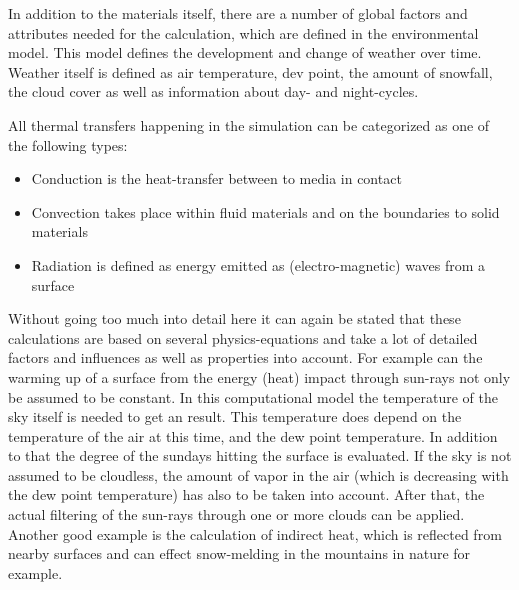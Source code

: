 In addition to the materials itself, there are a number of global factors and attributes needed for the calculation, which are defined in the environmental model. This model defines the development and change of weather over time. Weather itself is defined as air temperature, dev point, the amount of snowfall, the cloud cover as well as information about day- and night-cycles.

All thermal transfers happening in the simulation can be categorized as one of the following types:
\begin{itemize}
	\item Conduction is the heat-transfer between to media in contact
	\item Convection takes place within fluid materials and on the boundaries to solid materials
	\item Radiation is defined as energy emitted as (electro-magnetic) waves from a surface
\end{itemize}

Without going too much into detail here it can again be stated that these calculations are based on several physics-equations and take a lot of detailed factors and influences as well as properties into account. For example can the warming up of a surface from the energy (heat) impact through sun-rays not only be assumed to be constant. In this computational model the temperature of the sky itself is needed to get an result. This temperature does depend on the temperature of the air at this time, and the dew point temperature. In addition to that the degree of the sundays hitting the surface is evaluated. If the sky is not assumed to be cloudless, the amount of vapor in the air (which is decreasing with the dew point temperature) has also to be taken into account. After that, the actual filtering of the sun-rays through one or more clouds can be applied. Another good example is the calculation of indirect heat, which is reflected from nearby surfaces and can effect snow-melding in the mountains in nature for example.

